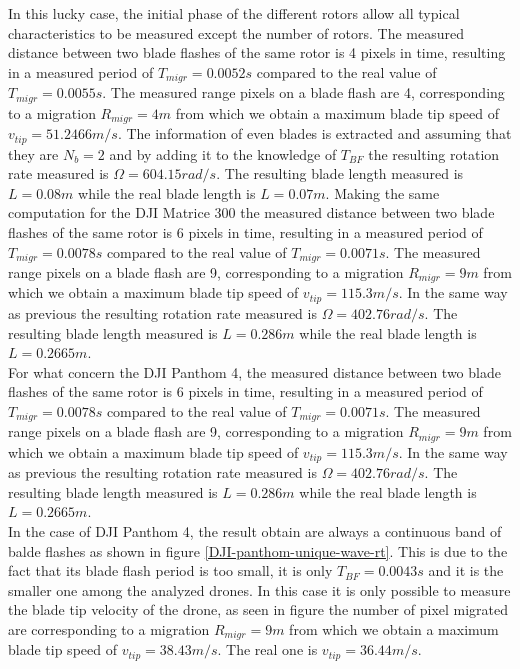 In this lucky case, the initial phase of the different rotors allow all typical characteristics to be measured except the number of rotors. The measured distance between two blade flashes of the same rotor is 4 pixels in time, resulting in a measured period of $T_{migr} = 0.0052s$ compared to the real value of $T_{migr} = 0.0055s$. The measured range pixels on a blade flash are 4, corresponding to a migration $R_{migr}=4m$ from which we obtain a maximum blade tip speed of $v_{tip} = 51.2466 m/s$. The information of even blades is extracted and assuming that they are $N_b = 2$ and by adding it to the knowledge of $T_{BF}$ the resulting rotation rate measured is $\Omega = 604.15 rad/s$. The resulting blade length measured is $L = 0.08 m$ while the real blade length is $ L = 0.07 m$.
Making the same computation for the DJI Matrice 300 the measured distance between two blade flashes of the same rotor is 6 pixels in time, resulting in a measured period of $T_{migr} = 0.0078s$ compared to the real value of $T_{migr} = 0.0071s$. The measured range pixels on a blade flash are 9, corresponding to a migration $R_{migr}=9m$ from which we obtain a maximum blade tip speed of $v_{tip} = 115.3 m/s$. In the same way as previous the resulting rotation rate measured is $\Omega = 402.76 rad/s$. The resulting blade length measured is $L = 0.286 m$ while the real blade length is $ L = 0.2665 m$.\\
For what concern the DJI Panthom 4, the measured distance between two blade flashes of the same rotor is 6 pixels in time, resulting in a measured period of $T_{migr} = 0.0078s$ compared to the real value of $T_{migr} = 0.0071s$. The measured range pixels on a blade flash are 9, corresponding to a migration $R_{migr}=9m$ from which we obtain a maximum blade tip speed of $v_{tip} = 115.3 m/s$. In the same way as previous the resulting rotation rate measured is $\Omega = 402.76 rad/s$. The resulting blade length measured is $L = 0.286 m$ while the real blade length is $ L = 0.2665 m$.\\
In the case of DJI Panthom 4, the result obtain are always a continuous band of balde flashes as shown in figure \ref{DJI-panthom-unique-wave-rt}. This is due to the fact that its blade flash period is too small, it is only $T_{BF} = 0.0043s$ and it is the smaller one among the analyzed drones. In this case it is only possible to measure the blade tip velocity of the drone, as seen in figure the number of pixel migrated are corresponding to a migration $R_{migr}=9m$ from which we obtain a maximum blade tip speed of $v_{tip} =  38.43 m/s$. The real one is $v_{tip} =  36.44 m/s$.

